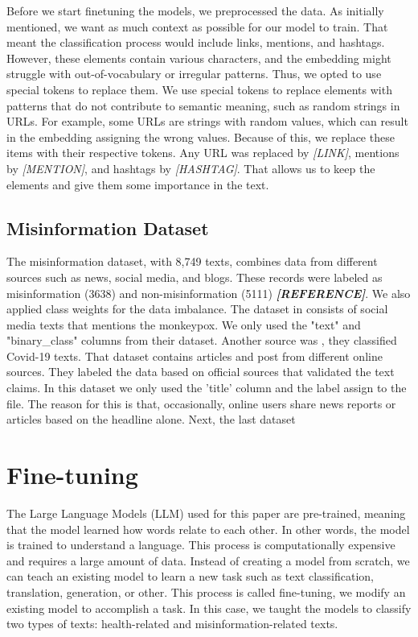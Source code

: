 Before we start finetuning the models, we preprocessed the data. As initially mentioned, we want as much context as possible for our model to train. That meant the classification
process would include links, mentions, and hashtags. However, these elements contain various characters, and the embedding might struggle with out-of-vocabulary or irregular
patterns. Thus, we opted to use special tokens to replace them. We use special tokens to replace elements with patterns that do not contribute to semantic meaning, such as random
strings in URLs. For example, some URLs are strings with random values, which can result in the embedding assigning the wrong values. Because of this, we replace these items with
their respective tokens. Any URL was replaced by \textit{[LINK]}, mentions by \textit{[MENTION]}, and hashtags by \textit{[HASHTAG]}. That allows us to keep the elements and give
them some importance in the text.

\subsection{Misinformation Dataset}
The misinformation dataset, with 8,749 texts, combines data from different sources such as news, social media, and blogs. These records were labeled as misinformation (3638) and
non-misinformation (5111) \textbf{\textit{[REFERENCE]}}. We also applied class weights for the data imbalance. The dataset in \cite{stephencrone2022} consists of social media texts
that mentions the monkeypox. We only used the "text" and "binary\_class" columns from their dataset. Another source was \cite{coviddata}, they classified Covid-19 texts. That dataset contains
articles and post from different online sources. They labeled the data based on official sources that validated the text claims. In this dataset we only used the 'title' column and the label assign to the file.
The reason for this is that, occasionally, online users share news reports or articles based on the headline alone. Next, the last dataset \cite{covidunesco}


\section{Fine-tuning}

The Large Language Models (LLM) used for this paper are pre-trained, meaning that the model learned how words relate to each other. In other words, the model is trained to understand a language.
This process is computationally expensive and requires a large amount of data. Instead of creating a model from scratch, we can teach an existing model to learn a new task such as text classification,
translation, generation, or other. This process is called fine-tuning, we modify an existing model to accomplish a task. In this case, we taught the models to classify two types of texts: health-related and
misinformation-related texts. 
\newline

